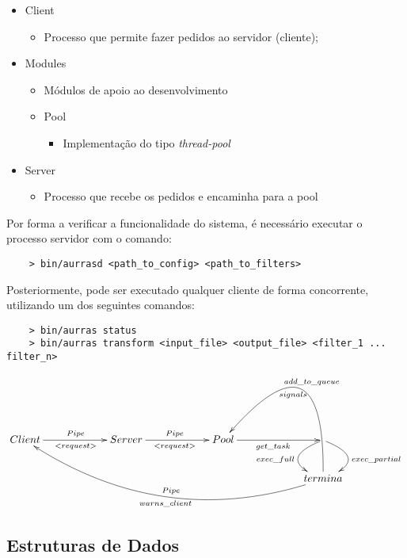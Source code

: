 \documentclass{article}
\begin{document}
\begin{itemize}
    \item Client
          \begin{itemize}
              \item Processo que permite fazer pedidos ao servidor (cliente);
          \end{itemize}
    \item Modules
          \begin{itemize}
              \item Módulos de apoio ao desenvolvimento
              \item Pool
                    \begin{itemize}
                        \item Implementação do tipo \textit{thread-pool}
                    \end{itemize}
          \end{itemize}
    \item Server
          \begin{itemize}
              \item Processo que recebe os pedidos e encaminha para a pool
          \end{itemize}
\end{itemize}

Por forma a verificar a funcionalidade do sistema, é necessário executar o processo servidor com o comando:
\begin{verbatim}
    > bin/aurrasd <path_to_config> <path_to_filters>
\end{verbatim}

Posteriormente, pode ser executado qualquer cliente de forma concorrente, utilizando um dos seguintes comandos:
\begin{verbatim}
    > bin/aurras status
    > bin/aurras transform <input_file> <output_file> <filter_1 ... filter_n>
\end{verbatim}

\begin{equation*}
    \xymatrixcolsep{5pc}\xymatrix {
    Client\ar[r]_{<request>}^{Pipe} & Server\ar[r]_{<request>}^{Pipe} & Pool\ar[r]_{get\_task} &\ar@/_2pc/[d]_{exec\_full}\ar@/^2pc/[d]^{exec\_partial}\\
    & & & termina\ar@/^3pc/[ulll]^{warns\_client}_{Pipe} \ar@/_6pc/[ul]_{add\_to\_queue}^{signals}
    }
\end{equation*}

\subsection{Estruturas de Dados}
\end{document}
